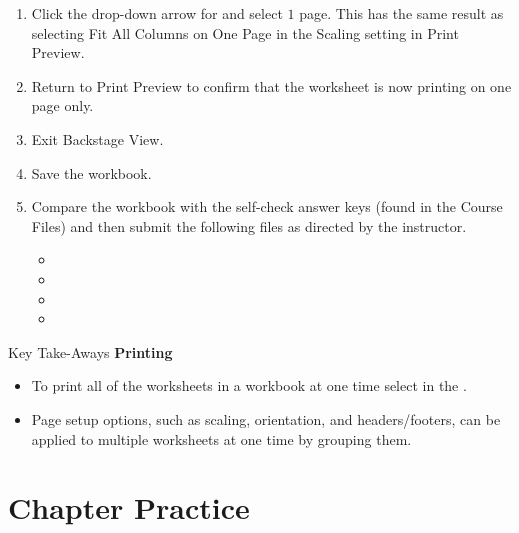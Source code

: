 \begin{enumerate}
	\item Click the drop-down arrow for  and select $ 1 $ page. This has the same result as selecting Fit All Columns on One Page in the Scaling setting in Print Preview.
	\item Return to Print Preview to confirm that the  worksheet is now printing on one page only.
	\item Exit Backstage View.
	\item Save the  workbook.
	\item Compare the workbook with the self-check answer keys (found in the Course Files) and then submit the following files as directed by the instructor.
	
	\begin{itemize}
		\item {}
		\item {}
		\item {}
		\item {}
	\end{itemize}

\end{enumerate}

\begin{center}
	\begin{tkwbox}{Key Take-Aways}
		\textbf{Printing}
		\\
		\begin{itemize}
			\setlength{\itemsep}{0pt}
			\setlength{\parskip}{0pt}
			\setlength{\parsep}{0pt}
			
			\item To print all of the worksheets in a workbook at one time select  in the .
			\item Page setup options, such as scaling, orientation, and headers/footers, can be applied to multiple worksheets at one time by grouping them.
			
		\end{itemize}
	\end{tkwbox}
\end{center}

\section{Chapter Practice}

